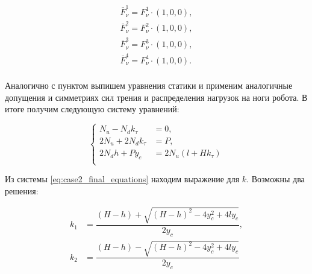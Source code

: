 \begin{equation}
\label{eq:F_nu_i}
\begin{alignedat}{1}
\overline{F}_\nu^1 = F_\nu^1\cdot(1,0,0), \\
\overline{F}_\nu^2 = F_\nu^2\cdot(1,0,0), \\
\overline{F}_\nu^3 = F_\nu^3\cdot(1,0,0), \\
\overline{F}_\nu^4 = F_\nu^4\cdot(1,0,0). \\
\end{alignedat}
\end{equation}

Аналогично с пунктом  выпишем уравнения статики и применим аналогичные допущения и симметриях сил трения и распределения нагрузок на ноги робота. В итоге получим следующую систему уравнений:

\begin{equation}
\label{eq:case2_final_equations}
\left\{
\begin{alignedat}{3}
  N_u - N_dk_\tau &= 0,\\
  2N_u + 2N_d k_\tau &= P,\\
  2 N_d h + P y_c &= 2 N_u (l + H k_\tau)\\
  \end{alignedat}
\right.
\end{equation}


Из системы \ref{eq:case2_final_equations} находим выражение для  $k$. Возможны два решения:

\begin{equation}
\label{eq:case2_k12}
    \begin{alignedat}{3}    
      k_1 &= \dfrac{(H-h) + \sqrt{(H-h)^2 - 4y^2_c + 4ly_c}}{2y_c}, \\
      k_2 &= \dfrac{(H-h) - \sqrt{(H-h)^2 - 4y^2_c + 4ly_c}}{2y_c} \\
    \end{alignedat}
\end{equation}

